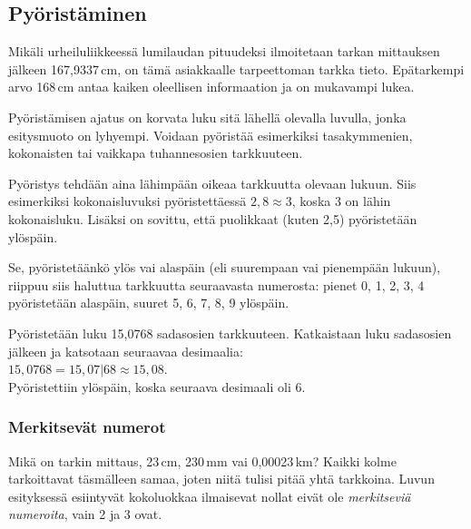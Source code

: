 %
%
%
%
%
%
%
%

\subsection*{Pyöristäminen}

Mikäli urheiluliikkeessä lumilaudan pituudeksi ilmoitetaan tarkan mittauksen jälkeen 167,9337\,cm, on tämä asiakkaalle tarpeettoman tarkka tieto. Epätarkempi arvo 168\,cm antaa kaiken oleellisen informaation ja on mukavampi lukea.

Pyöristämisen ajatus on korvata luku sitä lähellä olevalla luvulla, jonka esitysmuoto on lyhyempi. Voidaan pyöristää esimerkiksi tasakymmenien, kokonaisten tai vaikkapa tuhannesosien tarkkuuteen.

Pyöristys tehdään aina lähimpään oikeaa tarkkuutta olevaan lukuun. Siis esimerkiksi kokonaisluvuksi pyöristettäessä $2,8 \approx 3$, koska 3 on lähin kokonaisluku. Lisäksi on sovittu, että puolikkaat (kuten 2,5) pyöristetään ylöspäin.

Se, pyöristetäänkö ylös vai alaspäin (eli suurempaan vai pienempään lukuun), riippuu siis haluttua tarkkuutta seuraavasta numerosta: pienet 0, 1, 2, 3, 4 pyöristetään alaspäin, suuret 5, 6, 7, 8, 9 ylöspäin.

\begin{esimerkki}
Pyöristetään luku 15,0768 sadasosien tarkkuuteen. Katkaistaan luku sadasosien jälkeen ja katsotaan seuraavaa desimaalia:\\
$15,0768 = 15,07|68 \approx 15,08$.\\
Pyöristettiin ylöspäin, koska seuraava desimaali oli 6.
\end{esimerkki}


\subsubsection*{Merkitsevät numerot}

Mikä on tarkin mittaus, 23\,cm, 230\,mm vai 0,00023\,km? Kaikki kolme tarkoittavat täsmälleen samaa, joten niitä tulisi pitää
yhtä tarkkoina. Luvun esityksessä esiintyvät kokoluokkaa ilmaisevat nollat eivät ole \emph{merkitseviä numeroita}, vain 2 ja 3 ovat.


